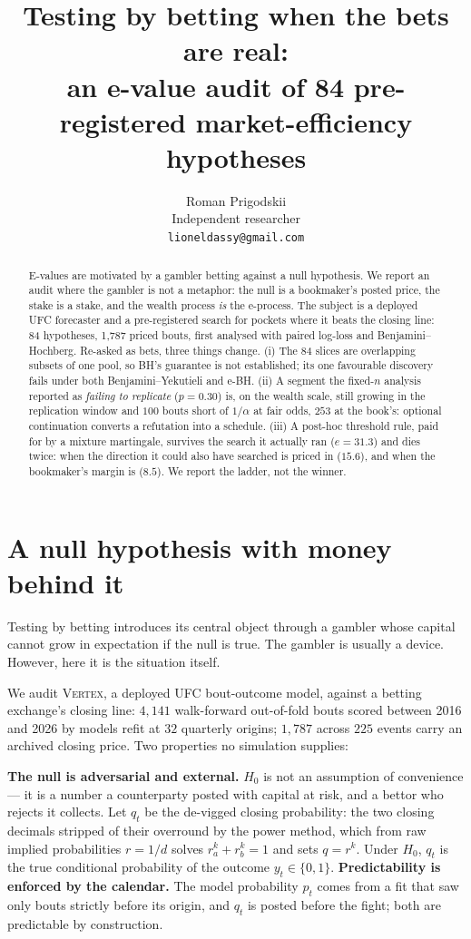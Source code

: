 \documentclass{article}
\title{Testing by betting when the bets are real:\\an e-value audit of 84 pre-registered market-efficiency hypotheses}
\author{%
  Roman Prigodskii \\
  Independent researcher \\
  \texttt{lioneldassy@gmail.com} \\
}
\begin{document}
\maketitle

\begin{abstract}
E-values are motivated by a gambler betting against a null hypothesis. We report an audit where the gambler is not a metaphor: the null is a bookmaker's posted price, the stake is a stake, and the wealth process \emph{is} the e-process. The subject is a deployed UFC forecaster and a pre-registered search for pockets where it beats the closing line: 84 hypotheses, 1{,}787 priced bouts, first analysed with paired log-loss and Benjamini--Hochberg. Re-asked as bets, three things change. (i) The 84 slices are overlapping subsets of one pool, so BH's guarantee is not established; its one favourable discovery fails under both Benjamini--Yekutieli and e-BH. (ii) A segment the fixed-$n$ analysis reported as \emph{failing to replicate} ($p=0.30$) is, on the wealth scale, still growing in the replication window and $100$ bouts short of $1/\alpha$ at fair odds, $253$ at the book's: optional continuation converts a refutation into a schedule. (iii) A post-hoc threshold rule, paid for by a mixture martingale, survives the search it actually ran ($e=31.3$) and dies twice: when the direction it could also have searched is priced in ($15.6$), and when the bookmaker's margin is ($8.5$). We report the ladder, not the winner.
\end{abstract}

\section{A null hypothesis with money behind it}

Testing by betting \citep{shafer2021,grunwald2024,vovk2021,ramdas2023} introduces its central object through a gambler whose capital cannot grow in expectation if the null is true. The gambler is usually a device. However, here it is the situation itself.

We audit \textsc{Vertex}, a deployed UFC bout-outcome model, against a betting exchange's closing line: $4{,}141$ walk-forward out-of-fold bouts scored between 2016 and 2026 by models refit at $32$ quarterly origins; $1{,}787$ across $225$ events carry an archived closing price. Two properties no simulation supplies:

\textbf{The null is adversarial and external.} $H_0$ is not an assumption of convenience --- it is a number a counterparty posted with capital at risk, and a bettor who rejects it collects. Let $q_t$ be the de-vigged closing probability: the two closing decimals stripped of their overround by the power method, which from raw implied probabilities $r=1/d$ solves $r_a^k+r_b^k=1$ and sets $q=r^k$. Under $H_0$, $q_t$ is the true conditional probability of the outcome $y_t\in\{0,1\}$. \textbf{Predictability is enforced by the calendar.} The model probability $p_t$ comes from a fit that saw only bouts strictly before its origin, and $q_t$ is posted before the fight; both are predictable by construction.
\end{document}

